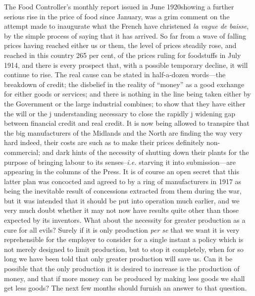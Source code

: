 \documentclass{book}
\begin{document}
The Food Controller’s monthly report issued in June 1920\footnotemark[1] showing a further serious rise in the price of food since January, was a grim comment on the attempt made to inaugurate what the French have christened \emph{la vague de baisse}, by the simple process of saying that it has arrived. So far from a wave of falling prices having reached either us or them, the level of prices steadily rose, and reached in this country 265 per cent, of the prices ruling for foodstuffs in July 1914, and there is every prospect that, with a possible temporary decline, it will continue to rise. The real cause can be stated in half-a-dozen words—the breakdown of credit; the disbelief in the reality of “money” as a good exchange for either goods or services; and there is nothing in the line being taken either by the Government or the large industrial combines; to show that they have either the will or the j understanding necessary to close the rapidly j widening gap between financial credit and real credit. It is now being allowed to transpire that the big manufacturers of the Midlands and the North are finding the way very hard indeed, their costs are such as to make their prices definitely non-commercial; and dark hints of the necessity of shutting down their plants for the purpose of bringing labour to its senses–\emph{i.e.} starving it into submission—are appearing in the columns of the Press. It is of course an open secret that this latter plan was concocted and agreed to by a ring of manufacturers in 1917 as being the inevitable result of concessions extracted from them during the war, but it was intended that it should be put into operation much earlier, and we very much doubt whether it may not now have results quite other than those expected by its inventors. What about the necessity for greater production as a cure for all evils? Surely if it is only production \emph{per se} that we want it is very reprehensible for the employer to consider for a single instant a policy which is not merely designed to limit production, but to stop it completely, when for so long we have been told that only greater production will save us. Can it be possible that the only production it is desired to increase is the production of money, and that if more money can be produced by making less goods we shall get less goods? The next few months should furnish an answer to that question.
\end{document}
